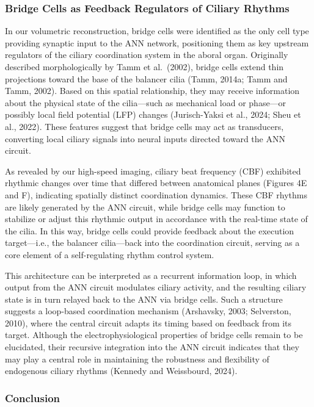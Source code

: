 \documentclass[
  11pt,
]{article}
\begin{document}
\subsubsection{Bridge Cells as Feedback Regulators of Ciliary
Rhythms}\label{bridge-cells-as-feedback-regulators-of-ciliary-rhythms}

In our volumetric reconstruction, bridge cells were identified as the
only cell type providing synaptic input to the ANN network, positioning
them as key upstream regulators of the ciliary coordination system in
the aboral organ. Originally described morphologically by Tamm et
al.~(2002), bridge cells extend thin projections toward the base of the
balancer cilia (Tamm, 2014a; Tamm and Tamm, 2002). Based on this spatial
relationship, they may receive information about the physical state of
the cilia---such as mechanical load or phase---or possibly local field
potential (LFP) changes (Jurisch-Yaksi et al., 2024; Sheu et al., 2022).
These features suggest that bridge cells may act as transducers,
converting local ciliary signals into neural inputs directed toward the
ANN circuit.

As revealed by our high-speed imaging, ciliary beat frequency (CBF)
exhibited rhythmic changes over time that differed between anatomical
planes (Figures 4E and F), indicating spatially distinct coordination
dynamics. These CBF rhythms are likely generated by the ANN circuit,
while bridge cells may function to stabilize or adjust this rhythmic
output in accordance with the real-time state of the cilia. In this way,
bridge cells could provide feedback about the execution target---i.e.,
the balancer cilia---back into the coordination circuit, serving as a
core element of a self-regulating rhythm control system.

This architecture can be interpreted as a recurrent information loop, in
which output from the ANN circuit modulates ciliary activity, and the
resulting ciliary state is in turn relayed back to the ANN via bridge
cells. Such a structure suggests a loop-based coordination mechanism
(Arshavsky, 2003; Selverston, 2010), where the central circuit adapts
its timing based on feedback from its target. Although the
electrophysiological properties of bridge cells remain to be elucidated,
their recursive integration into the ANN circuit indicates that they may
play a central role in maintaining the robustness and flexibility of
endogenous ciliary rhythms (Kennedy and Weissbourd, 2024).

\subsubsection{Conclusion}\label{conclusion}
\end{document}
